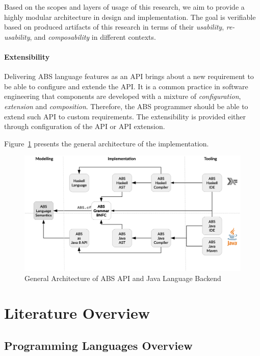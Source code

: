 Based on the scopes and layers of usage of this research, we aim to provide 
a highly modular architecture in design and implementation.
The goal is verifiable based on produced artifacts of this research in terms
of their \emph{usability}, \emph{re-usability}, and \emph{composability} in
different contexts.

\paragraph{Extensibility}
Delivering ABS language features as an API brings about a new requirement to be able to configure and extende the API. 
It is a common practice in software engineering that components are developed with a mixture of \emph{configuration}, \emph{extension} and \emph{composition}.
Therefore, the ABS programmer should be able to extend such API to custom requirements. 
The extensibility is provided either through configuration of the API or API extension.

Figure~\ref{fig:arch} presents the general architecture of the implementation.

\begin{figure}[h]
\centering
\includegraphics[scale=0.3]{../figs/Arch.eps}
\caption[General Architecture]{General Architecture of ABS API and Java Language Backend}
\label{fig:arch}
\end{figure}

\section{Literature Overview}
\label{sec:intro:rel}

\subsection{Programming Languages Overview}
\label{sec:intro:proglangs}


